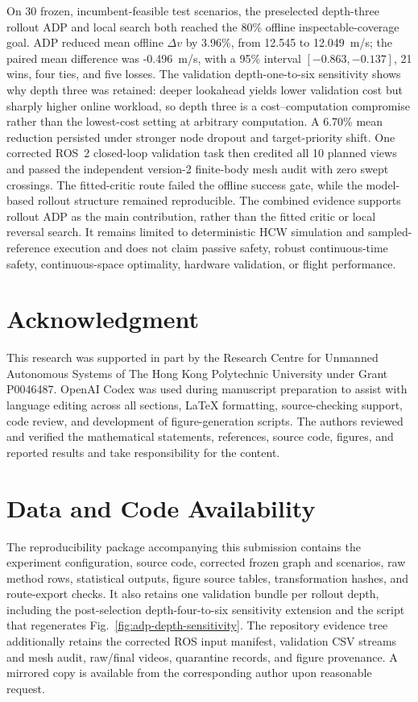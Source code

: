 \documentclass{IEEEtaes}
\newcommand{\unit}[2]{#1~#2}
\theoremstyle{remark}
\theoremstyle{plain}
\begin{document}
On 30 frozen, incumbent-feasible test scenarios, the preselected depth-three rollout ADP and local search both reached the 80\% offline inspectable-coverage goal. ADP reduced mean offline $\Delta v$ by 3.96\%, from 12.545 to \unit{12.049}{m/s}; the paired mean difference was \unit{-0.496}{m/s}, with a 95\% interval $[-0.863,-0.137]$, 21 wins, four ties, and five losses. The validation depth-one-to-six sensitivity shows why depth three was retained: deeper lookahead yields lower validation cost but sharply higher online workload, so depth three is a cost--computation compromise rather than the lowest-cost setting at arbitrary computation. A 6.70\% mean reduction persisted under stronger node dropout and target-priority shift. One corrected ROS~2 closed-loop validation task then credited all 10 planned views and passed the independent version-2 finite-body mesh audit with zero swept crossings. The fitted-critic route failed the offline success gate, while the model-based rollout structure remained reproducible. The combined evidence supports rollout ADP as the main contribution, rather than the fitted critic or local reversal search. It remains limited to deterministic HCW simulation and sampled-reference execution and does not claim passive safety, robust continuous-time safety, continuous-space optimality, hardware validation, or flight performance.

\section*{Acknowledgment}
This research was supported in part by the Research Centre for Unmanned Autonomous Systems of The Hong Kong Polytechnic University under Grant P0046487. OpenAI Codex was used during manuscript preparation to assist with language editing across all sections, LaTeX formatting, source-checking support, code review, and development of figure-generation scripts. The authors reviewed and verified the mathematical statements, references, source code, figures, and reported results and take responsibility for the content.

\section*{Data and Code Availability}
The reproducibility package accompanying this submission contains the experiment configuration, source code, corrected frozen graph and scenarios, raw method rows, statistical outputs, figure source tables, transformation hashes, and route-export checks. It also retains one validation bundle per rollout depth, including the post-selection depth-four-to-six sensitivity extension and the script that regenerates Fig.~\ref{fig:adp-depth-sensitivity}. The repository evidence tree additionally retains the corrected ROS input manifest, validation CSV streams and mesh audit, raw/final videos, quarantine records, and figure provenance. A mirrored copy is available from the corresponding author upon reasonable request.
\end{document}
